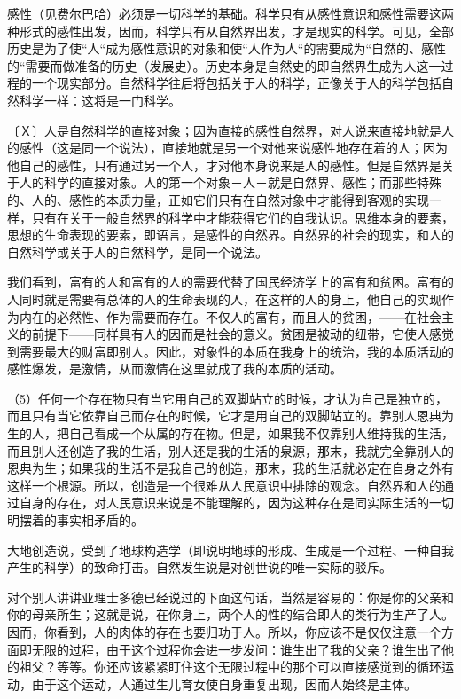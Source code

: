 \documentclass[a4paper,twoside,12pt,AutoFakeBold]{ctexart}
\begin{document}
感性（见费尔巴哈）必须是一切科学的基础。科学只有从感性意识和感性需要这两种形式的感性出发，因而，科学只有从自然界出发，才是现实的科学。可见，全部历史是为了使“人“成为感性意识的对象和使“人作为人“的需要成为“自然的、感性的“需要而做准备的历史（发展史）。历史本身是自然史的即自然界生成为人这一过程的一个现实部分。自然科学往后将包括关于人的科学，正像关于人的科学包括自然科学一样：这将是一门科学。

〔Ｘ〕人是自然科学的直接对象；因为直接的感性自然界，对人说来直接地就是人的感性（这是同一个说法），直接地就是另一个对他来说感性地存在着的人；因为他自己的感性，只有通过另一个人，才对他本身说来是人的感性。但是自然界是关于人的科学的直接对象。人的第一个对象－人－就是自然界、感性；而那些特殊的、人的、感性的本质力量，正如它们只有在自然对象中才能得到客观的实现一样，只有在关于一般自然界的科学中才能获得它们的自我认识。思维本身的要素，思想的生命表现的要素，即语言，是感性的自然界。自然界的社会的现实，和人的自然科学或关于人的自然科学，是同一个说法。

我们看到，富有的人和富有的人的需要代替了国民经济学上的富有和贫困。富有的人同时就是需要有总体的人的生命表现的人，在这样的人的身上，他自己的实现作为内在的必然性、作为需要而存在。不仅人的富有，而且人的贫困，——在社会主义的前提下——同样具有人的因而是社会的意义。贫困是被动的纽带，它使人感觉到需要最大的财富即别人。因此，对象性的本质在我身上的统治，我的本质活动的感性爆发，是激情，从而激情在这里就成了我的本质的活动。

（5）任何一个存在物只有当它用自己的双脚站立的时候，才认为自己是独立的，而且只有当它依靠自己而存在的时候，它才是用自己的双脚站立的。靠别人恩典为生的人，把自己看成一个从属的存在物。但是，如果我不仅靠别人维持我的生活，而且别人还创造了我的生活，别人还是我的生活的泉源，那末，我就完全靠别人的恩典为生；如果我的生活不是我自己的创造，那末，我的生活就必定在自身之外有这样一个根源。所以，创造是一个很难从人民意识中排除的观念。自然界和人的通过自身的存在，对人民意识来说是不能理解的，因为这种存在是同实际生活的一切明摆着的事实相矛盾的。

大地创造说，受到了地球构造学（即说明地球的形成、生成是一个过程、一种自我产生的科学）的致命打击。自然发生说是对创世说的唯一实际的驳斥。

对个别人讲讲亚理士多德已经说过的下面这句话，当然是容易的：你是你的父亲和你的母亲所生；这就是说，在你身上，两个人的性的结合即人的类行为生产了人。因而，你看到，人的肉体的存在也要归功于人。所以，你应该不是仅仅注意一个方面即无限的过程，由于这个过程你会进一步发问：谁生出了我的父亲？谁生出了他的祖父？等等。你还应该紧紧盯住这个无限过程中的那个可以直接感觉到的循环运动，由于这个运动，人通过生儿育女使自身重复出现，因而人始终是主体。
\end{document}
